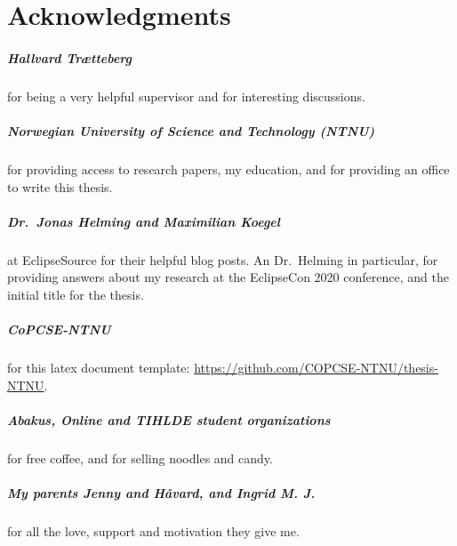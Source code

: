 \cleardoublepage{} %
\chapter*{Acknowledgments}

\paragraph*{Hallvard Trætteberg} for being a very helpful supervisor
and for interesting discussions.

\paragraph*{Norwegian University of Science and Technology (NTNU)} for providing access to research papers, my education, and for providing an office to write this thesis. 

\paragraph*{Dr.\ Jonas Helming and Maximilian Koegel} at EclipseSource for their helpful blog posts. An Dr.\ Helming in particular, for providing answers about my research at the EclipseCon 2020 conference, and the initial title for the thesis.

\paragraph*{CoPCSE-NTNU} for this latex document template: \href{https://github.com/COPCSE-NTNU/thesis-NTNU}{https://github.com/COPCSE-NTNU/thesis-NTNU}.

\paragraph{Abakus, Online and TIHLDE student organizations} for free coffee, and for selling noodles and candy.

\paragraph{My parents Jenny and Håvard, and Ingrid M. J.} for all the love, support and motivation they give me.



